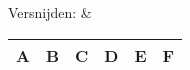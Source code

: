 Versnijden: &
\begin{tabular}{|c|c|c|c|c|c|}
	\hline 
	\textbf{A} & \textbf{B} & \textbf{C} & \textbf{D} & \textbf{E} & \textbf{F} \\
	\hline 
\end{tabular} \\